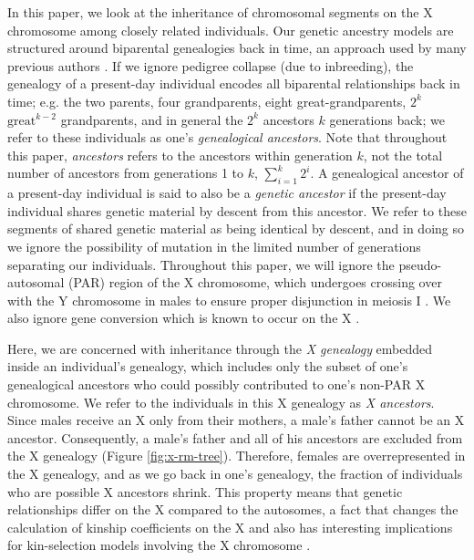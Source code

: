 \documentclass[11pt]{article}
\begin{document}
In this paper, we look at the inheritance of chromosomal segments on the X
chromosome among closely related individuals. Our genetic ancestry models are
structured around biparental genealogies back in time, an approach used by many
previous authors \citep[e.g.,][]{Donnelly:1983fi,
chang1999recent,Barton:2011iq,Rohde:2004kl}. If we ignore pedigree collapse
(due to inbreeding), the genealogy of a present-day individual encodes all
biparental relationships back in time; e.g. the two parents, four grandparents,
eight great-grandparents, $2^k$ $\text{great}^{k-2}$ grandparents, and in
general the $2^k$ ancestors $k$ generations back; we refer to these individuals
as one's \emph{genealogical ancestors}. Note that throughout this paper,
\emph{ancestors} refers to the ancestors within generation $k$, not the total
number of ancestors from generations 1 to $k$, $\sum_{i=1}^k 2^i$. A
genealogical ancestor of a present-day individual is said to also be a
\emph{genetic ancestor} if the present-day individual shares genetic material
by descent from this ancestor.  We refer to these segments of shared genetic
material as being identical by descent, and in doing so we ignore the
possibility of mutation in the limited number of generations separating our
individuals. Throughout this paper, we will ignore the pseudo-autosomal (PAR)
region of the X chromosome, which undergoes crossing over with the Y chromosome
in males \citep{koller1934genetical} to ensure proper disjunction in meiosis I
\citep{hassold1991xy}. We also ignore gene conversion which is known to occur
on the X \citep{Rosser:2009df}. 

Here, we are concerned with inheritance through the \emph{X genealogy} embedded
inside an individual's genealogy, which includes only the subset of one's
genealogical ancestors who could possibly contributed to one's non-PAR X
chromosome. We refer to the individuals in this X genealogy as \emph{X
ancestors}. Since males receive an X only from their mothers, a male's father
cannot be an X ancestor. Consequently, a male's father and all of his ancestors
are excluded from the X genealogy (Figure \ref{fig:x-rm-tree}). Therefore,
females are overrepresented in the X genealogy, and as we go back in one's
genealogy, the fraction of individuals who are possible X ancestors shrink.
This property means that genetic relationships differ on the X compared to the
autosomes, a fact that changes the calculation of kinship coefficients on the X
\citep{pinto2012general,pinto2011x} and also has interesting implications for
kin-selection models involving the X chromosome
\citep{Fox:2009kh,rice2008sexually}.
\end{document}
